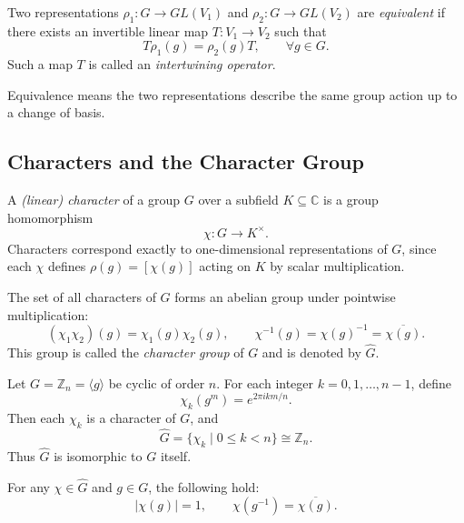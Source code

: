 \begin{definition}
Two representations $\rho_1:G\to GL(V_1)$ and $\rho_2:G\to GL(V_2)$ are \emph{equivalent} if there exists an invertible linear map $T:V_1\to V_2$ such that
\[
T\rho_1(g) = \rho_2(g)T, \qquad \forall g\in G.
\]
Such a map $T$ is called an \emph{intertwining operator}.
\end{definition}

\begin{remark}
Equivalence means the two representations describe the same group action up to a change of basis.
\end{remark}

\subsection{Characters and the Character Group}

\begin{definition}[Character]\label{def:character}
A \emph{(linear) character} of a group $G$ over a subfield $K\subseteq\mathbb{C}$ is a group homomorphism
\[
\chi: G \longrightarrow K^\times.
\]
Characters correspond exactly to one-dimensional representations of $G$,  
since each $\chi$ defines $\rho(g)=[\chi(g)]$ acting on $K$ by scalar multiplication.
\end{definition}

\begin{definition}\label{def:char_group}
The set of all characters of $G$ forms an abelian group under pointwise multiplication:
\[
(\chi_1\chi_2)(g)=\chi_1(g)\chi_2(g),\qquad \chi^{-1}(g)=\chi(g)^{-1}=\overline{\chi(g)}.
\]
This group is called the \emph{character group} of $G$ and is denoted by $\widehat{G}$.
\end{definition}

\begin{example}\label{ex:cyclic}
Let $G=\mathbb{Z}_n=\langle g\rangle$ be cyclic of order $n$.  
For each integer $k=0,1,\dots,n-1$, define
\[
\chi_k(g^m)=e^{2\pi i k m / n}.
\]
Then each $\chi_k$ is a character of $G$, and
\[
\widehat{G}=\{\chi_k\mid 0\le k<n\}\cong\mathbb{Z}_n.
\]
Thus $\widehat{G}$ is isomorphic to $G$ itself.
\end{example}

\begin{lemma}\label{lem:char_basic}
For any $\chi\in\widehat{G}$ and $g\in G$, the following hold:
\[
|\chi(g)|=1, \qquad \chi(g^{-1})=\overline{\chi(g)}.
\]
\end{lemma}

